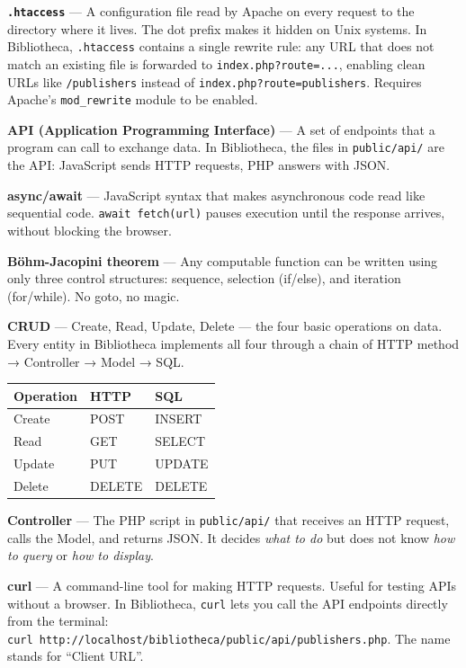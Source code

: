 \documentclass[11pt,a4paper,oneside]{book}
\begin{document}
\textbf{\texttt{.htaccess}} --- A configuration file read by
Apache on every request to the directory where it lives. The dot
prefix makes it hidden on Unix systems. In Bibliotheca,
\texttt{.htaccess} contains a single rewrite rule: any URL that
does not match an existing file is forwarded to
\texttt{index.php?route=...}, enabling clean URLs like
\texttt{/publishers} instead of
\texttt{index.php?route=publishers}. Requires Apache's
\texttt{mod\_rewrite} module to be enabled.

\textbf{API (Application Programming Interface)} --- A set of
endpoints that a program can call to exchange data. In
Bibliotheca, the files in \texttt{public/api/} are the API:
JavaScript sends HTTP requests, PHP answers with JSON.

\textbf{async/await} --- JavaScript syntax that makes
asynchronous code read like sequential code.
\texttt{await\ fetch(url)} pauses execution until the response
arrives, without blocking the browser.

\textbf{Böhm-Jacopini theorem} --- Any computable function can be
written using only three control structures: sequence, selection
(if/else), and iteration (for/while). No goto, no magic.

\textbf{CRUD} --- Create, Read, Update, Delete --- the four basic
operations on data. Every entity in Bibliotheca implements all
four through a chain of HTTP method → Controller → Model → SQL.

\begin{longtable}[]{@{}lll@{}}
\toprule
Operation & HTTP & SQL \\
\midrule
\endhead
Create & POST & INSERT \\
Read & GET & SELECT \\
Update & PUT & UPDATE \\
Delete & DELETE & DELETE \\
\bottomrule
\end{longtable}

\textbf{Controller} --- The PHP script in \texttt{public/api/}
that receives an HTTP request, calls the Model, and returns JSON.
It decides \emph{what to do} but does not know \emph{how to
query} or \emph{how to display}.

\textbf{curl} --- A command-line tool for making HTTP requests.
Useful for testing APIs without a browser. In Bibliotheca,
\texttt{curl} lets you call the API endpoints directly from the
terminal:
\texttt{curl\ http://localhost/bibliotheca/public/api/publishers.php}.
The name stands for ``Client URL''.
\end{document}
